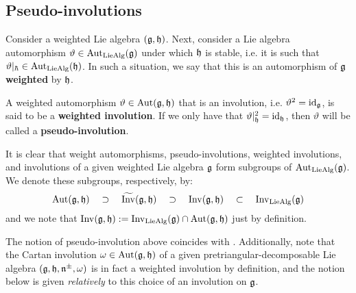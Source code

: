     \subsection{Pseudo-involutions}
        \begin{definition} \label{def: weighted_automorphisms_of_weighted_lie_algebras}
            Consider a weighted Lie algebra $(\mathfrak{g}, \mathfrak{h})$. Next, consider a Lie algebra automorphism $\vartheta \in \operatorname{Aut}_{\mathrm{Lie}\mathrm{Alg}}(\mathfrak{g})$ under which $\mathfrak{h}$ is stable, i.e. it is such that $\vartheta|_{\hbar} \in \operatorname{Aut}_{\mathrm{Lie}\mathrm{Alg}}(\mathfrak{h})$. In such a situation, we say that this is an automorphism of $\mathfrak{g}$ \textbf{weighted} by $\mathfrak{h}$.
            
            A weighted automorphism $\vartheta \in \operatorname{Aut}(\mathfrak{g}, \mathfrak{h})$ that is an involution, i.e. $\vartheta^2 = \mathrm{id}_{\mathfrak{g}}$, is said to be a \textbf{weighted involution}. If we only have that $\vartheta|_{\mathfrak{h}}^2 = \mathrm{id}_{\mathfrak{h}}$, then $\vartheta$ will be called a \textbf{pseudo-involution}. 
        \end{definition}
        It is clear that weight automorphisms, pseudo-involutions, weighted involutions, and involutions of a given weighted Lie algebra $\mathfrak{g}$ form subgroups of $\operatorname{Aut}_{\mathrm{Lie}\mathrm{Alg}}(\mathfrak{g})$. We denote these subgroups, respectively, by:
            $$\operatorname{Aut}(\mathfrak{g}, \mathfrak{h}) \quad \supset \quad \widetilde{\operatorname{Inv}}(\mathfrak{g}, \mathfrak{h}) \quad \supset \quad \operatorname{Inv}(\mathfrak{g}, \mathfrak{h}) \quad \subset \quad \operatorname{Inv}_{\mathrm{Lie}\mathrm{Alg}}(\mathfrak{g})$$
        and we note that $\operatorname{Inv}(\mathfrak{g}, \mathfrak{h}) := \operatorname{Inv}_{\mathrm{Lie}\mathrm{Alg}}(\mathfrak{g}) \cap \operatorname{Aut}(\mathfrak{g}, \mathfrak{h})$ just by definition.
        \begin{remark}
            The notion of pseudo-involution above coincides with \cite[Definition 1.1]{regelskis_vlaar_kac_moody_pseudo_symmetric_pairs}. Additionally, note that the Cartan involution $\omega \in \operatorname{Aut}(\mathfrak{g}, \mathfrak{h})$ of a given pretriangular-decomposable Lie algebra $(\mathfrak{g}, \mathfrak{h}, \mathfrak{n}^{\pm}, \omega)$ is in fact a weighted involution by definition, and the notion below is given \textit{relatively} to this choice of an involution on $\mathfrak{g}$.
        \end{remark}

